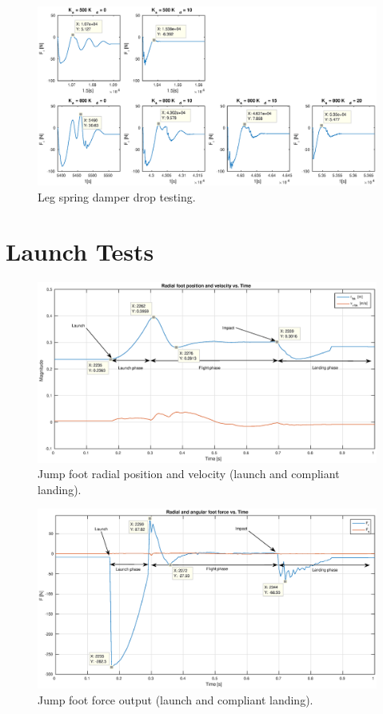 \begin{figure}
\centering
\includegraphics[width=1\textwidth]{images/experiments/drop-test-force-plots.eps} 
\caption{Leg spring damper drop testing.}
\label{fig:drop-tests}
\end{figure}

\section{Launch Tests}

\begin{figure}
\centering
\includegraphics[width=1\textwidth]{images/experiments/jump/jump-foot-position-velocity.eps} 
\caption{Jump foot radial position and velocity (launch and compliant landing).}
\label{fig:Jump foot radial position and velocity}
\end{figure}

\begin{figure}
\centering
\includegraphics[width=1\textwidth]{images/experiments/jump/jump-foot-force.eps} 
\caption{Jump foot force output (launch and compliant landing).}
\label{fig:Jump foot force output}
\end{figure}

